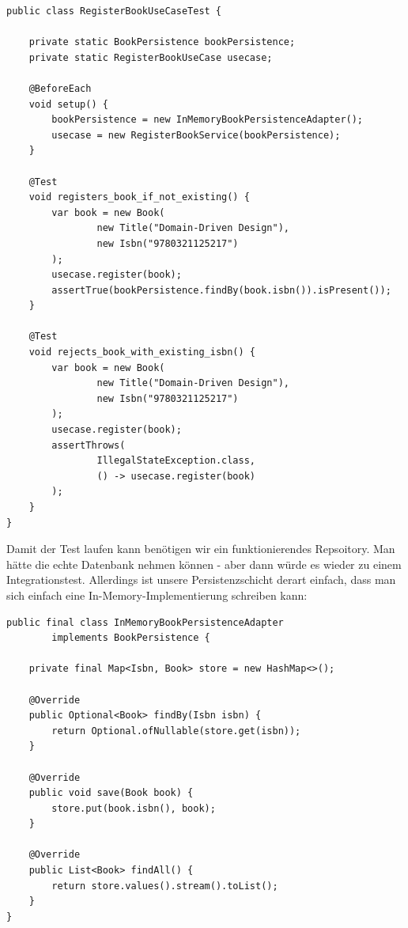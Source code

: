 \begin{listing}[H]
\begin{verbatim}
public class RegisterBookUseCaseTest {
    
    private static BookPersistence bookPersistence;
    private static RegisterBookUseCase usecase;

    @BeforeEach
    void setup() {
        bookPersistence = new InMemoryBookPersistenceAdapter();
        usecase = new RegisterBookService(bookPersistence);
    }

    @Test
    void registers_book_if_not_existing() {
        var book = new Book(
                new Title("Domain-Driven Design"),
                new Isbn("9780321125217")
        );
        usecase.register(book);
        assertTrue(bookPersistence.findBy(book.isbn()).isPresent());
    }

    @Test
    void rejects_book_with_existing_isbn() {
        var book = new Book(
                new Title("Domain-Driven Design"),
                new Isbn("9780321125217")
        );
        usecase.register(book);
        assertThrows(
                IllegalStateException.class,
                () -> usecase.register(book)
        );
    }
}
\end{verbatim}
\caption{RegisterBookUseCase Unit Test}
\label{lst:RegisterBookUseCaseTest}
\end{listing}

Damit der Test laufen kann benötigen wir ein funktionierendes Repsoitory.
Man hätte die echte Datenbank nehmen können - aber dann würde es wieder 
zu einem Integrationstest. Allerdings ist unsere Persistenzschicht derart
einfach, dass man sich einfach eine In-Memory-Implementierung schreiben kann:

\begin{listing}[H]
\begin{verbatim}
public final class InMemoryBookPersistenceAdapter
        implements BookPersistence {

    private final Map<Isbn, Book> store = new HashMap<>();

    @Override
    public Optional<Book> findBy(Isbn isbn) {
        return Optional.ofNullable(store.get(isbn));
    }

    @Override
    public void save(Book book) {
        store.put(book.isbn(), book);
    }

    @Override
    public List<Book> findAll() {
        return store.values().stream().toList();
    }
}

\end{verbatim}
\caption{InMemoryBookPersistenceAdapter}
\label{lst:InMemoryBookPersistenceAdapter}
\end{listing}

